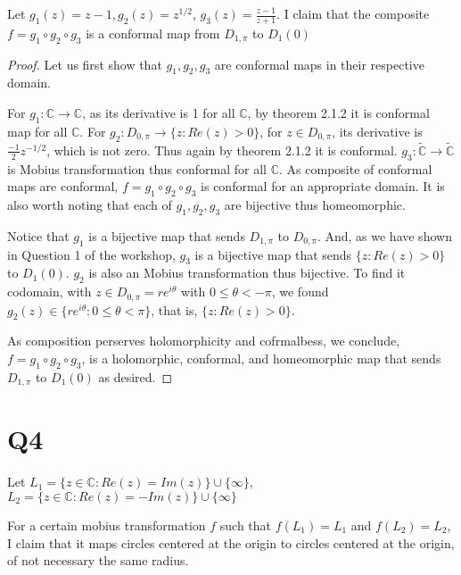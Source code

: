 \documentclass[12pt, a4paper]{article}
\theoremstyle{definition}
\theoremstyle{remark}
\newcommand{\bb}[1]{\mathbb{#1}}
\begin{document}
Let $g_1(z) = z - 1, g_2(z) = z^{1/2}$, $g_3(z) = \frac{z-1}{z+1}$. I claim that the composite $f = g_1 \circ g_2 \circ g_3 $ is a conformal map from $D_{1, \pi}$ to $D_1(0)$

\begin{proof}
	Let us first show that $g_1, g_2, g_3$ are conformal maps in their respective domain.

	For $g_1: \bb{C} \rightarrow  \bb{C}$, as its derivative is 1 for all $\bb{C}$, by theorem 2.1.2 it is conformal map for all $\bb{C}$.
	For $g_2: D_{0, \pi} \rightarrow  \{z : Re(z) > 0\}$, for $z \in D_{0, \pi}$, its derivative is $\frac{-1}{2}z^{-1/2}$, which is not zero. Thus again by theorem 2.1.2 it is conformal.
	$g_3: \tilde{\bb{C}} \rightarrow  \tilde{\bb{C}} $ is Mobius transformation thus conformal for all $\bb{C}$. As composite of conformal maps are conformal, $ f = g_1 \circ g_2 \circ g_3$ is conformal for an appropriate domain. It is also worth noting that each of $g_1, g_2, g_3$ are bijective thus homeomorphic.

	Notice that $g_1$ is a bijective map that sends $D_{1, \pi}$ to $D_{0, \pi}$. And, as we have shown in Question 1 of the workshop, $g_3$ is a bijective map that sends $\{z: Re(z) > 0\} $ to $D_1 (0)$. 
	$g_2$ is also an Mobius transformation thus bijective. To find it codomain, with $z \in D_{0, \pi} = re^{i \theta}$ with $0 \leq \theta < -\pi $, we found $g_2(z) \in \{re^{i \theta}: 0\leq\theta <\pi\} $, that is, $\{z : Re(z) > 0\}$.

	As composition perserves holomorphicity and cofrmalbess, we conclude, $f = g_1 \circ g_2 \circ g_3$, is a holomorphic, conformal, and homeomorphic map that sends $D_{1, \pi}$ to $D_1(0)$ as desired.
\end{proof}

\section{Q4}

Let $L_1 = \{z \in \bb{C}: Re(z) = Im(z)\} \cup \{\infty\}$, $L_2 = \{z \in \bb{C}: Re(z) = -Im(z)\} \cup \{\infty\}$

For a certain mobius transformation $f$ such that $f(L_1) = L_1$ and $f(L_2) = L_2$, I claim that it maps circles centered at the origin to circles centered at the origin, of not necessary the same radius.
\end{document}
